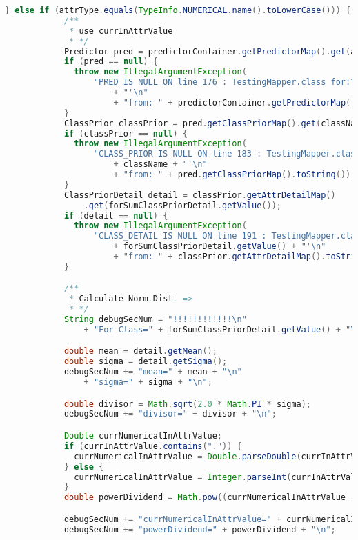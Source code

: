 \begin{lstlisting}[language=Java,basicstyle=\tiny,caption=TestingMapper.java]
          } else if (attrType.equals(TypeInfo.NUMERICAL.name().toLowerCase())) {
            /**
             * use currInAttrValue
             * */
            Predictor pred = predictorContainer.getPredictorMap().get(attrName);
            if (pred == null) {
              throw new IllegalArgumentException(
                  "PRED IS NULL ON line 176 : TestingMapper.class for:\nattrName='" + attrName
                      + "'\n"
                      + "from: " + predictorContainer.getPredictorMap().toString());
            }
            ClassPrior classPrior = pred.getClassPriorMap().get(className);
            if (classPrior == null) {
              throw new IllegalArgumentException(
                  "CLASS_PRIOR IS NULL ON line 183 : TestingMapper.class for:\nclassName='"
                      + className + "'\n"
                      + "from: " + pred.getClassPriorMap().toString());
            }
            ClassPriorDetail detail = classPrior.getAttrDetailMap()
                .get(forSumClassPriorDetail.getValue());
            if (detail == null) {
              throw new IllegalArgumentException(
                  "CLASS_DETAIL IS NULL ON line 191 : TestingMapper.class for:\nclassVal='"
                      + forSumClassPriorDetail.getValue() + "'\n"
                      + "from: " + classPrior.getAttrDetailMap().toString());
            }

            /**
             * Calculate Norm.Dist. =>
             * */
            String debugSecNum = "!!!!!!!!!!!!\n"
                + "For Class=" + forSumClassPriorDetail.getValue() + "\n";

            double mean = detail.getMean();
            double sigma = detail.getSigma();
            debugSecNum += "mean=" + mean + "\n"
                + "sigma=" + sigma + "\n";

            double divisor = Math.sqrt(2.0 * Math.PI * sigma);
            debugSecNum += "divisor=" + divisor + "\n";

            Double currNumericalInAttrValue;
            if (currInAttrValue.contains(".")) {
              currNumericalInAttrValue = Double.parseDouble(currInAttrValue);
            } else {
              currNumericalInAttrValue = Integer.parseInt(currInAttrValue) * 1.0;
            }
            double powerDividend = Math.pow((currNumericalInAttrValue - mean), 2) * -1;

            debugSecNum += "currNumericalInAttrValue=" + currNumericalInAttrValue + "\n";
            debugSecNum += "powerDividend=" + powerDividend + "\n";


\end{lstlisting}
